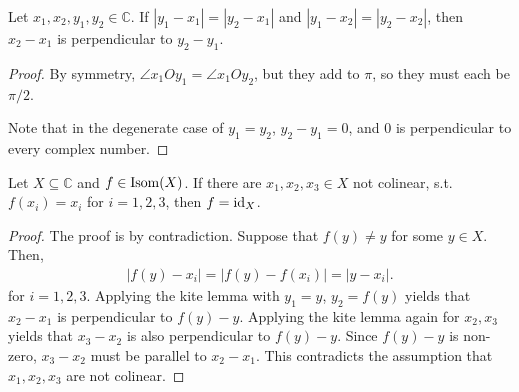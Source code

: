 \documentclass[12pt]{article}
\begin{document}
\begin{lemma}
    Let $x_{1},x_{2},y_{1},y_{2} \in \mathbb{C}$.
    If $|y_{1} - x_{1}| = |y_{2} - x_{1}|$
    and $|y_{1} - x_{2}| = |y_{2} - x_{2}|$,
    then $x_{2} - x_{1}$ is perpendicular to $y_{2} - y_{1}$.
\end{lemma}
\begin{center}
\end{center}

\begin{proof}
    By symmetry, $\angle x_{1}O y_{1} = \angle x_{1} O y_{2}$,
    but they add to $\pi$, so they must each be $\pi/2$.

    Note that in the degenerate case of $y_{1} = y_{2}$,
    $y_{2} - y_{1} = 0$, and $0$ is perpendicular to every complex number.
\end{proof}

\begin{lemma}
    Let $X \subseteq \mathbb{C}$ and $f \in \operatorname{Isom}(X)$.
    If there are $x_{1},x_{2},x_{3} \in X$
    not colinear, s.t. $f(x_i) = x_i$
    for $i = 1,2,3$, then $f = \operatorname{id}_{X}$.
\end{lemma}
\begin{proof}
    The proof is by contradiction.
    Suppose that $f(y) \ne y$ for some $y \in X$.
    Then,
    \begin{align*}
        |f(y) - x_i| = |f(y) - f(x_i)| = |y - x_i|.
    \end{align*}
    for $i = 1,2,3$.
    Applying the kite lemma with $y_{1}=y$, $y_{2}=f(y)$ yields that
    $x_{2} - x_{1}$ is perpendicular to $f(y) - y$.
    Applying the kite lemma again for $x_{2},x_{3}$ yields that
    $x_{3} - x_{2}$ is also perpendicular to $f(y) - y$.
    Since $f(y) - y$ is non-zero, $x_{3} - x_{2}$ must be parallel to $x_{2} - x_{1}$.
    This contradicts the assumption that $x_{1},x_{2},x_{3}$ are not colinear. \contra
\end{proof}
\end{document}
